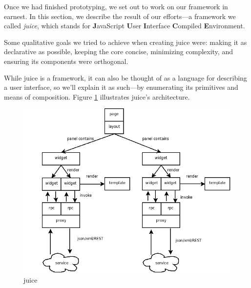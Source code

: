 \documentclass[10pt, twocolumn]{article}
\begin{document}
Once we had finished prototyping, we set out to work on our
framework in earnest. In this section, we describe the result of
our efforts---a framework we called \emph{juice}, which stands for
\textbf{J}avaScript \textbf{U}ser \textbf{I}nterface
\textbf{C}ompiled \textbf{E}nvironment.

Some qualitative goals we tried to achieve when creating juice
were: making it as declarative as possible, keeping the core
concise, minimizing complexity, and ensuring its components were
orthogonal.

While juice is a framework, it can also be thought of as a
language for describing a user interface, so we'll explain it as
such---by enumerating its primitives and means of composition.
Figure \ref{architecture} illustrates juice's architecture.
\begin{figure}
  \centering
  \includegraphics[scale=0.35]{architecture.png}
  \caption{juice}
  \label{architecture}
\end{figure}
\end{document}
